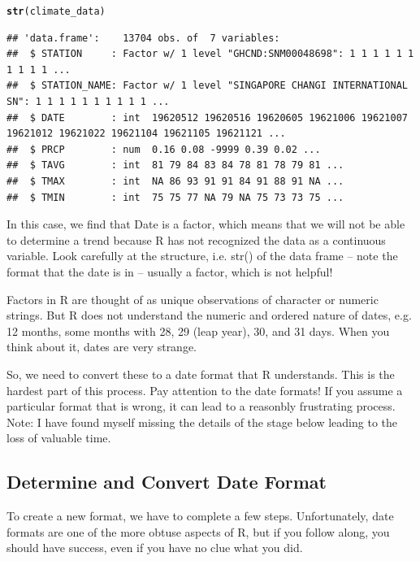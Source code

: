 \documentclass{article}\usepackage[]{graphicx}\usepackage[]{color}
\makeatletter
\newcommand{\hlstd}[1]{\textcolor[rgb]{0.345,0.345,0.345}{#1}}%
\newcommand{\hlkwd}[1]{\textcolor[rgb]{0.737,0.353,0.396}{\textbf{#1}}}%
\newenvironment{kframe}{%
 \def\at@end@of@kframe{}%
 \ifinner\ifhmode%
  \def\at@end@of@kframe{\end{minipage}}%
  \begin{minipage}{\columnwidth}%
 \fi\fi%
 \def\FrameCommand##1{\hskip\@totalleftmargin \hskip-\fboxsep
 \colorbox{shadecolor}{##1}\hskip-\fboxsep
     \hskip-\linewidth \hskip-\@totalleftmargin \hskip\columnwidth}%
 \MakeFramed {\advance\hsize-\width
   \@totalleftmargin\z@ \linewidth\hsize
   \@setminipage}}%
 {\par\unskip\endMakeFramed%
 \at@end@of@kframe}
\newenvironment{knitrout}{}{} %
\makeatother
\begin{document}
\begin{knitrout}
\color{fgcolor}\begin{kframe}
\begin{alltt}
\hlkwd{str}\hlstd{(climate_data)}
\end{alltt}
\begin{verbatim}
## 'data.frame':	13704 obs. of  7 variables:
##  $ STATION     : Factor w/ 1 level "GHCND:SNM00048698": 1 1 1 1 1 1 1 1 1 1 ...
##  $ STATION_NAME: Factor w/ 1 level "SINGAPORE CHANGI INTERNATIONAL SN": 1 1 1 1 1 1 1 1 1 1 ...
##  $ DATE        : int  19620512 19620516 19620605 19621006 19621007 19621012 19621022 19621104 19621105 19621121 ...
##  $ PRCP        : num  0.16 0.08 -9999 0.39 0.02 ...
##  $ TAVG        : int  81 79 84 83 84 78 81 78 79 81 ...
##  $ TMAX        : int  NA 86 93 91 91 84 91 88 91 NA ...
##  $ TMIN        : int  75 75 77 NA 79 NA 75 73 73 75 ...
\end{verbatim}
\end{kframe}
\end{knitrout}

In this case, we find that Date is a factor, which means that we will not be able to determine a trend because R has not recognized the data as a continuous variable. Look carefully at the structure, i.e. str() of the data frame -- note the format that the date is in -- usually a factor, which is not helpful!  

Factors in R are thought of as unique observations of character or numeric strings. But R does not understand the numeric and ordered nature of dates, e.g. 12 months, some months with 28, 29 (leap year), 30, and 31 days. When you think about it, dates are very strange. 

So, we need to convert these to a date format that R understands. This is the hardest part of this process. Pay attention to the date formats!  If you assume a particular format that is wrong, it can lead to a reasonbly frustrating process. Note: I have found myself missing the details of the stage below leading to the loss of valuable time. 


\subsection{Determine and Convert Date Format}

To create a new format, we have to complete a few steps. Unfortunately, date formats are one of the more obtuse aspects of R, but if you follow along, you should have success, even if you have no clue what you did. 
\end{document}
